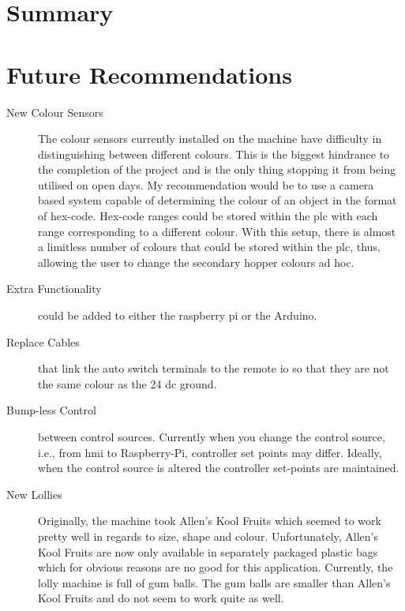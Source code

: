 \section{Summary}

\section{Future Recommendations}

\begin{description}

    \item[New Colour Sensors] The colour sensors currently installed on the machine have difficulty in distinguishing between different colours. This is the biggest hindrance to the completion of the project and is the only thing stopping it from being utilised on open days. My recommendation would be to use a camera based system capable of determining the colour of an object in the format of hex-code. Hex-code ranges could be stored within the \acrshort{plc} with each range corresponding to a different colour. With this setup, there is almost a limitless number of colours that could be stored within the \acrshort{plc}, thus, allowing the user to change the secondary hopper colours ad hoc.
    
    \item[Extra Functionality] could be added to either the raspberry pi or the Arduino.
    
    \item[Replace Cables] that link the auto switch terminals to the remote io so that they are not the same colour as the 24 dc ground.
    
    \item[Bump-less Control] between control sources. Currently when you change the control source, i.e., from \acrshort{hmi} to Raspberry-Pi, controller set points may differ.  Ideally, when the control source is altered the controller set-points are maintained. 
    
    \item[New Lollies] Originally, the machine took Allen's Kool Fruits which seemed to work pretty well in regards to size, shape and colour. Unfortunately, Allen's Kool Fruits are now only available in separately packaged plastic bags which for obvious reasons are no good for this application. Currently, the lolly machine is full of gum balls. The gum balls are smaller than Allen's Kool Fruits and do not seem to work quite as well. 
    

\end{description}

